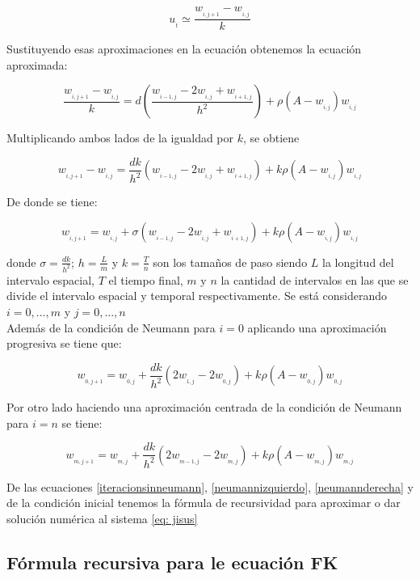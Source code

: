 $$u_{_{t}}\simeq\frac{w_{_{i,j+1}}-w_{_{i,j}}}{k}$$

Sustituyendo esas aproximaciones en la ecuación obtenemos la ecuación aproximada:

$$\dfrac{w_{_{i,j+1}}-w_{_{i,j}}}{k}=d\left(\dfrac{w_{_{i-1,j}}-2w_{_{i,j}}+w_{_{i+1,j}}}{h^{2}}\right)+\rho(A-w_{_{i,j}})w_{_{i,j}}$$

Multiplicando ambos lados de la igualdad por $k$, se obtiene

$$w_{_{i,j+1}}-w_{_{i,j}}=\frac{dk}{h^{2}}(w_{_{i-1,j}}-2w_{_{i,j}}+w_{_{i+1,j}})+k\rho(A-w_{_{i,j}})w_{_{i,j}}$$

De donde se tiene:

\begin{equation}
	w_{_{i,j+1}}=w_{_{i,j}}+\sigma(w_{_{i-1,j}}-2w_{_{i,j}}+w_{_{i+1,j}})+k\rho(A-w_{_{i,j}})w_{_{i,j}}
	\label{iteracionsinneumann}
\end{equation}


donde $\sigma=\frac{dk}{h^{2}}$; $h=\frac{L}{m}$ y $k=\frac{T}{n}$ son los tamaños de paso siendo $L$ la longitud del intervalo espacial, $T$ el tiempo final, $m$ y $n$ la cantidad de intervalos en las que se divide el intervalo espacial y temporal respectivamente. Se está considerando $i=0,...,m$ y $j=0,...,n$ \\

Además de la condición de Neumann para $i=0$ aplicando una aproximación progresiva se tiene que:

\begin{equation}
	w_{_{0,j+1}}=w_{_{0,j}}+\frac{dk}{h^{2}}(2w_{_{1,j}}-2w_{_{0,j}})+k\rho(A-w_{_{0,j}})w_{_{0,j}}
	\label{neumannizquierdo}
\end{equation}

Por otro lado haciendo una aproximación centrada de la condición de  Neumann para $i=n$ se tiene:

\begin{equation}
	w_{_{m,j+1}}=w_{_{m,j}}+\frac{dk}{h^{2}}(2w_{_{m-1,j}}-2w_{_{m,j}})+k\rho(A-w_{_{m,j}})w_{_{m,j}}
	\label{neumannderecha}
\end{equation} 

De las ecuaciones \eqref{iteracionsinneumann}, \eqref{neumannizquierdo}, \eqref{neumannderecha} y de la condición inicial tenemos la fórmula de recursividad para aproximar o dar solución numérica al sistema \eqref{eq: jisus}

\subsection{Fórmula recursiva para le ecuación FK}

